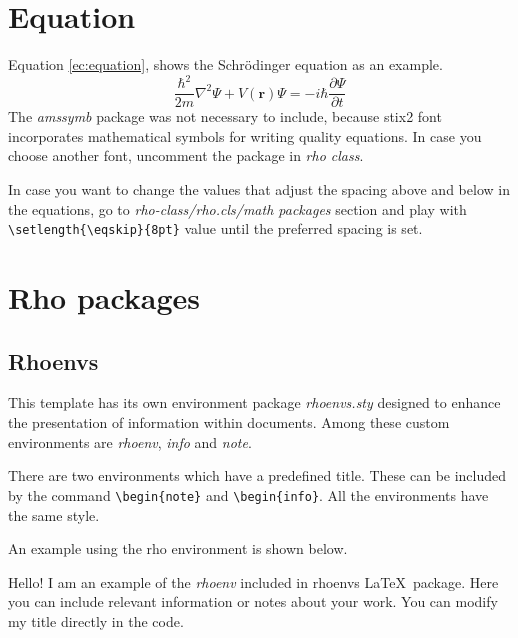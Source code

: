 \documentclass[9pt,a4paper,twoside]{rho-class/rho}
\begin{document}
\section{Equation}

    Equation \ref{ec:equation}, shows the Schrödinger equation as an example. 
        \begin{equation} \label{ec:equation}
            \frac{\hbar^2}{2m}\nabla^2\Psi + V(\mathbf{r})\Psi = -i\hbar \frac{\partial\Psi}{\partial t}
        \end{equation} 
    The \textit{amssymb} package was not necessary to include, because stix2 font incorporates mathematical symbols for writing quality equations. In case you choose another font, uncomment the package in \textit{rho class}.

    In case you want to change the values that adjust the spacing above and below in the equations, go to \textit{rho-class/rho.cls/math packages} section and play with \verb|\setlength{\eqskip}{8pt}| value until the preferred spacing is set.

\section{Rho packages}

    \subsection{Rhoenvs}
    
        This template has its own environment package \textit{rhoenvs.sty} designed to enhance the presentation of information within documents. Among these custom environments are \textit{rhoenv}, \textit{info} and \textit{note}.
    
        There are two environments which have a predefined title. These can be included by the command \verb|\begin{note}| and \verb|\begin{info}|. All the environments have the same style.
    	
        An example using the rho environment is shown below.
    
        \begin{rhoenv}[frametitle=Environment with custom title]
            Hello! I am an example of the \textit{rhoenv} included in rhoenvs \LaTeX\ package. Here you can include relevant information or notes about your work. You can modify my title directly in the code.
        \end{rhoenv}
    
\end{document}
